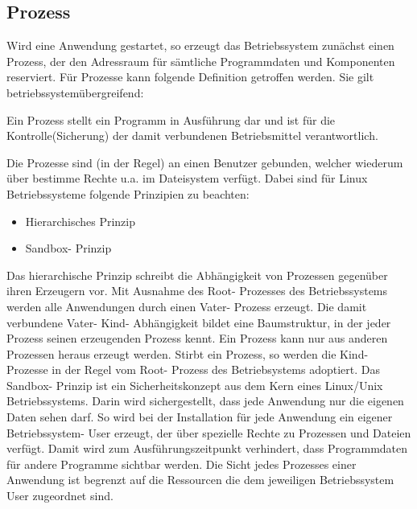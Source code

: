 \documentclass[12pt,oneside,a4paper,bibtotoc,liststotoc]{scrreprt}
\begin{document}
\subsection{Prozess}
Wird eine Anwendung gestartet, so erzeugt das Betriebssystem zunächst einen Prozess, der den Adressraum für sämtliche Programmdaten und Komponenten reserviert. Für Prozesse kann folgende Definition getroffen werden. Sie gilt betriebssystemübergreifend:
\begin{center}
Ein Prozess stellt ein Programm in Ausführung dar und
ist für die Kontrolle(Sicherung) der damit verbundenen Betriebsmittel
verantwortlich.
\end{center}
Die Prozesse sind (in der Regel) an einen Benutzer gebunden, welcher wiederum über bestimme Rechte u.a. im Dateisystem verfügt. Dabei sind für Linux Betriebssysteme folgende Prinzipien zu beachten:
\begin{itemize}
\item Hierarchisches Prinzip
\item Sandbox- Prinzip
\end{itemize}
Das hierarchische Prinzip schreibt die Abhängigkeit von Prozessen gegenüber ihren Erzeugern vor. Mit Ausnahme des Root- Prozesses des Betriebssystems werden alle Anwendungen durch einen Vater- Prozess erzeugt. Die damit verbundene Vater- Kind- Abhängigkeit bildet eine Baumstruktur, in der jeder Prozess seinen erzeugenden Prozess kennt. Ein Prozess kann nur aus anderen Prozessen heraus erzeugt werden. Stirbt ein Prozess, so werden die Kind- Prozesse in der Regel vom Root- Prozess des Betriebsystems adoptiert.\newline
Das Sandbox- Prinzip ist ein Sicherheitskonzept aus dem Kern eines Linux/Unix Betriebssystems. Darin wird sichergestellt, dass jede Anwendung nur die eigenen Daten sehen darf. So wird bei der Installation für jede Anwendung ein eigener Betriebssystem- User erzeugt, der über spezielle Rechte zu Prozessen und Dateien verfügt. Damit wird zum Ausführungszeitpunkt verhindert, dass Programmdaten für andere Programme sichtbar werden. Die Sicht jedes Prozesses einer Anwendung ist begrenzt auf die Ressourcen die dem jeweiligen Betriebssystem User zugeordnet sind.
\end{document}

